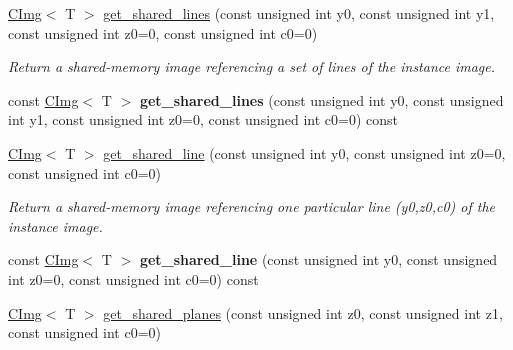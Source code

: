 \begin{DoxyCompactItemize}
\item 
\hypertarget{structcimg__library_1_1CImg_ab9c9a9f092060069b0d1770fbbcff761}{
\hyperlink{structcimg__library_1_1CImg}{CImg}$<$ T $>$ \hyperlink{structcimg__library_1_1CImg_ab9c9a9f092060069b0d1770fbbcff761}{get\_\-shared\_\-lines} (const unsigned int y0, const unsigned int y1, const unsigned int z0=0, const unsigned int c0=0)}
\label{structcimg__library_1_1CImg_ab9c9a9f092060069b0d1770fbbcff761}

\begin{DoxyCompactList}\small\item\em Return a shared-\/memory image referencing a set of lines of the instance image. \item\end{DoxyCompactList}\item 
\hypertarget{structcimg__library_1_1CImg_abae83bd734516838c048731f42b59d85}{
const \hyperlink{structcimg__library_1_1CImg}{CImg}$<$ T $>$ {\bfseries get\_\-shared\_\-lines} (const unsigned int y0, const unsigned int y1, const unsigned int z0=0, const unsigned int c0=0) const }
\label{structcimg__library_1_1CImg_abae83bd734516838c048731f42b59d85}

\item 
\hypertarget{structcimg__library_1_1CImg_a10e24ae9f5d4396cff135e59eb171ac4}{
\hyperlink{structcimg__library_1_1CImg}{CImg}$<$ T $>$ \hyperlink{structcimg__library_1_1CImg_a10e24ae9f5d4396cff135e59eb171ac4}{get\_\-shared\_\-line} (const unsigned int y0, const unsigned int z0=0, const unsigned int c0=0)}
\label{structcimg__library_1_1CImg_a10e24ae9f5d4396cff135e59eb171ac4}

\begin{DoxyCompactList}\small\item\em Return a shared-\/memory image referencing one particular line (y0,z0,c0) of the instance image. \item\end{DoxyCompactList}\item 
\hypertarget{structcimg__library_1_1CImg_a75b988c227e7652f39cc1b2b0b2e7c2e}{
const \hyperlink{structcimg__library_1_1CImg}{CImg}$<$ T $>$ {\bfseries get\_\-shared\_\-line} (const unsigned int y0, const unsigned int z0=0, const unsigned int c0=0) const }
\label{structcimg__library_1_1CImg_a75b988c227e7652f39cc1b2b0b2e7c2e}

\item 
\hypertarget{structcimg__library_1_1CImg_acb1c079369a55ad33883fe81569a3991}{
\hyperlink{structcimg__library_1_1CImg}{CImg}$<$ T $>$ \hyperlink{structcimg__library_1_1CImg_acb1c079369a55ad33883fe81569a3991}{get\_\-shared\_\-planes} (const unsigned int z0, const unsigned int z1, const unsigned int c0=0)}
\label{structcimg__library_1_1CImg_acb1c079369a55ad33883fe81569a3991}


\end{DoxyCompactItemize}
